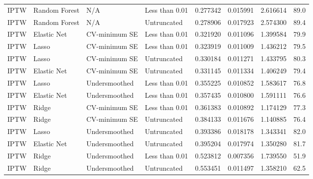 \begin{longtable}[l]{llllllll}
IPTW & Random Forest & N/A & Less than 0.01 & 0.277342 & 0.015991 & 2.616614 & 89.0\\
IPTW & Random Forest & N/A & Untruncated & 0.278906 & 0.017923 & 2.574300 & 89.4\\
IPTW & Elastic Net & CV-minimum SE & Less than 0.01 & 0.321920 & 0.011096 & 1.399584 & 79.9\\
IPTW & Lasso & CV-minimum SE & Less than 0.01 & 0.323919 & 0.011009 & 1.436212 & 79.5\\
IPTW & Lasso & CV-minimum SE & Untruncated & 0.330184 & 0.011271 & 1.433795 & 80.3\\
IPTW & Elastic Net & CV-minimum SE & Untruncated & 0.331145 & 0.011334 & 1.406249 & 79.4\\
IPTW & Lasso & Undersmoothed & Less than 0.01 & 0.355225 & 0.010852 & 1.583617 & 76.8\\
IPTW & Elastic Net & Undersmoothed & Less than 0.01 & 0.357435 & 0.010800 & 1.591111 & 76.6\\
IPTW & Ridge & CV-minimum SE & Less than 0.01 & 0.361383 & 0.010892 & 1.174129 & 77.3\\
IPTW & Ridge & CV-minimum SE & Untruncated & 0.384133 & 0.011676 & 1.140885 & 76.4\\
IPTW & Lasso & Undersmoothed & Untruncated & 0.393386 & 0.018178 & 1.343341 & 82.0\\
IPTW & Elastic Net & Undersmoothed & Untruncated & 0.395204 & 0.017974 & 1.350280 & 81.7\\
IPTW & Ridge & Undersmoothed & Less than 0.01 & 0.523812 & 0.007356 & 1.739550 & 51.9\\
IPTW & Ridge & Undersmoothed & Untruncated & 0.553451 & 0.011497 & 1.358210 & 62.5\\
\bottomrule
\end{longtable}
